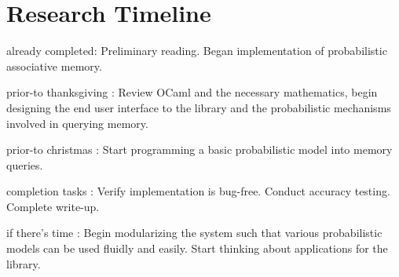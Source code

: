 \documentclass{sig-alternate}
\begin{document}
%

\section{Research Timeline}
\label{sec:research_timeline}

\begin{itemize*}
	\item {\sc already completed}: Preliminary reading. Began implementation of probabilistic associative memory.\vspace{3pt}
	\item {\sc prior-to thanksgiving} : Review OCaml and the necessary mathematics, begin designing the end user interface to the library and the probabilistic mechanisms involved in querying memory.\vspace{3pt}
	\item {\sc prior-to christmas} : Start programming a basic probabilistic model into memory queries.\vspace{3pt}
	\item {\sc completion tasks} : Verify implementation is bug-free. Conduct accuracy testing. Complete write-up.\vspace{3pt}
	\item {\sc if there's time} : Begin modularizing the system such that various probabilistic models can be used fluidly and easily. 
                                    Start thinking about applications for the library.
\end{itemize*}
\end{document}
